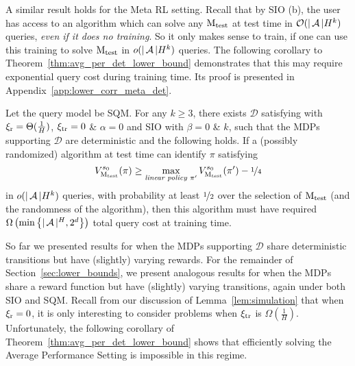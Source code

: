 \documentclass[11pt,twoside]{article}
\begin{document}
A similar result holds for the Meta RL setting. Recall that by SIO (b), the user has access to an algorithm which can solve any $\operatorname{M_{test}}$ at test time in $\mathcal{O}(\vert \operatorname{\mathcal{A}} \vert H^{k})$ queries, \emph{even if it does no training}. So it only makes sense to train, if one can use this training to solve $\operatorname{M_{test}}$ in $o(\vert \operatorname{\mathcal{A}} \vert H^k)$ queries. The following corollary to Theorem~\ref{thm:avg_per_det_lower_bound} demonstrates that this may require exponential query cost during training time. Its proof is presented in Appendix~\ref{app:lower_corr_meta_det}.
\begin{corollary}
\label{corollary:meta_rl_det}
Let the query model be SQM. For any $k \geq 3$, there exists $\mathcal{D}$ satisfying \weakprox{} with $\operatorname{\xi_r} =\Theta(\frac{1}{H})$, $\operatorname{\xi_{tr}} = 0$ \& $\alpha = 0$ and SIO with $\beta = 0$ \& $k$, such that the MDPs supporting $\mathcal{D}$ are deterministic and the following holds. If a (possibly randomized) algorithm at test time can identify $\pi$ satisfying
\begin{equation*}
V^{{s_0 }}_{{\operatorname{M_{test}} }}({\pi}) \geq \max_{\emph{\text{linear policy }} \pi'} V^{{s_0 }}_{{\operatorname{M_{test}} }}({\pi'}) - \nicefrac{1}{4}
\end{equation*}
in $o(\vert \operatorname{\mathcal{A}} \vert H^k)$ queries, with probability at least $\nicefrac{1}{2}$ over the selection of $\operatorname{M_{test}}$ (and the randomness of the algorithm), then this algorithm must have required $\Omega \left( \min \left \{ \vert \operatorname{\mathcal{A}} \vert^H, 2^d \right \} \right)$ total query cost at training time.
\end{corollary}

\noindent So far we presented results for when the MDPs supporting $\mathcal{D}$ share deterministic transitions but have (slightly) varying rewards. For the remainder of Section~\ref{sec:lower_bounds}, we present analogous results for when the MDPs share a reward function but have (slightly) varying transitions, again under both SIO and SQM. Recall from our discussion of Lemma~\ref{lem:simulation} that when $\operatorname{\xi_r} = 0$, it is only interesting to consider problems when $\operatorname{\xi_{tr}}$ is $\Omega(\frac{1}{H})$. Unfortunately, the following corollary of Theorem~\ref{thm:avg_per_det_lower_bound} shows that efficiently solving the Average Performance Setting is impossible in this regime.
\end{document}
